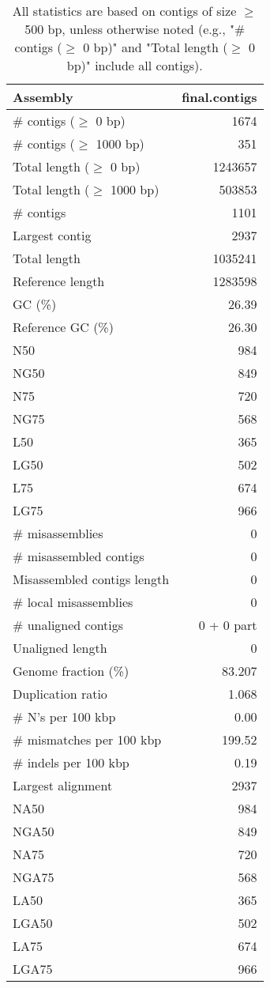 \documentclass[12pt,a4paper]{article}
\begin{document}
\begin{table}[ht]
\begin{center}
\caption{All statistics are based on contigs of size $\geq$ 500 bp, unless otherwise noted (e.g., "\# contigs ($\geq$ 0 bp)" and "Total length ($\geq$ 0 bp)" include all contigs).}
\begin{tabular}{|l*{1}{|r}|}
\hline
Assembly & final.contigs \\ \hline
\# contigs ($\geq$ 0 bp) & 1674 \\ \hline
\# contigs ($\geq$ 1000 bp) & 351 \\ \hline
Total length ($\geq$ 0 bp) & 1243657 \\ \hline
Total length ($\geq$ 1000 bp) & 503853 \\ \hline
\# contigs & 1101 \\ \hline
Largest contig & 2937 \\ \hline
Total length & 1035241 \\ \hline
Reference length & 1283598 \\ \hline
GC (\%) & 26.39 \\ \hline
Reference GC (\%) & 26.30 \\ \hline
N50 & 984 \\ \hline
NG50 & 849 \\ \hline
N75 & 720 \\ \hline
NG75 & 568 \\ \hline
L50 & 365 \\ \hline
LG50 & 502 \\ \hline
L75 & 674 \\ \hline
LG75 & 966 \\ \hline
\# misassemblies & 0 \\ \hline
\# misassembled contigs & 0 \\ \hline
Misassembled contigs length & 0 \\ \hline
\# local misassemblies & 0 \\ \hline
\# unaligned contigs & 0 + 0 part \\ \hline
Unaligned length & 0 \\ \hline
Genome fraction (\%) & 83.207 \\ \hline
Duplication ratio & 1.068 \\ \hline
\# N's per 100 kbp & 0.00 \\ \hline
\# mismatches per 100 kbp & 199.52 \\ \hline
\# indels per 100 kbp & 0.19 \\ \hline
Largest alignment & 2937 \\ \hline
NA50 & 984 \\ \hline
NGA50 & 849 \\ \hline
NA75 & 720 \\ \hline
NGA75 & 568 \\ \hline
LA50 & 365 \\ \hline
LGA50 & 502 \\ \hline
LA75 & 674 \\ \hline
LGA75 & 966 \\ \hline
\end{tabular}
\end{center}
\end{table}
\end{document}
